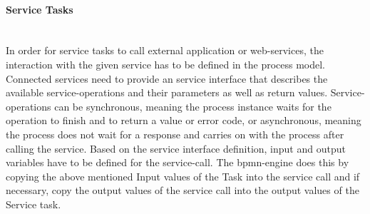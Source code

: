 \paragraph{Service Tasks}~\\
In order for service tasks to call external application or web-services, the interaction with the given service has to be defined in the process model. Connected services need to provide an service interface that describes the available service-operations and their parameters as well as return values. Service-operations can be synchronous, meaning the process instance waits for the operation to finish and to return a value or error code, or asynchronous, meaning the process does not wait for a response and carries on with the process after calling the service. Based on the service interface definition, input and output variables have to be defined for the service-call. The \gls{bpmn-engine} does this by copying the above mentioned Input values of the Task into the service call and if necessary, copy the output values of the service call into the output values of the Service task. \cite{fundamentals}





